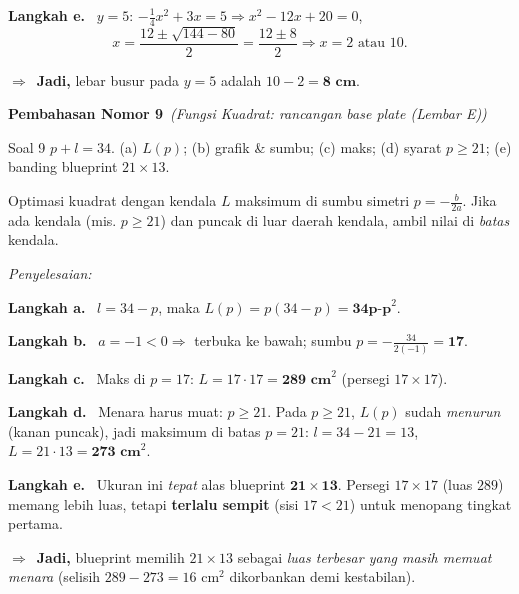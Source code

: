 \documentclass[11pt,a4paper]{article}
\newcommand{\jawab}{\par\smallskip\noindent\textit{\textcolor{oranye}{Penyelesaian:}}\par\smallskip}
\newcommand{\langkah}[1]{\par\smallskip\noindent\textbf{\textcolor{biru}{Langkah #1.}}\ }
\newcommand{\jadi}{\par\smallskip\noindent$\Rightarrow$\ \textbf{Jadi, }}
\newcommand{\nomorjudul}[2]{\par\bigskip\noindent%
  {\large\bfseries\color{ungu}Pembahasan Nomor #1}\ {\normalfont\itshape\color{gray}(#2)}\par\nopagebreak\smallskip}
\begin{document}
\langkah{e} $y=5$: $-\tfrac14x^2+3x=5\Rightarrow x^2-12x+20=0$,
\[
x=\frac{12\pm\sqrt{144-80}}{2}=\frac{12\pm8}{2}\Rightarrow x=2 \text{ atau } 10.
\]
\jadi lebar busur pada $y=5$ adalah $10-2=\textbf{8 cm}$.

\begin{center}
\end{center}

\nomorjudul{9}{Fungsi Kuadrat: rancangan base plate (Lembar E)}
\begin{soalbox}{Soal 9}
$p+l=34$. (a) $L(p)$; (b) grafik \& sumbu; (c) maks; (d) syarat $p\ge21$;
(e) banding blueprint $21\times13$.
\end{soalbox}

\begin{ingat}{Optimasi kuadrat dengan kendala}
$L$ maksimum di sumbu simetri $p=-\tfrac{b}{2a}$. Jika ada kendala (mis.
$p\ge21$) dan puncak di luar daerah kendala, ambil nilai di \emph{batas} kendala.
\end{ingat}

\jawab
\langkah{a} $l=34-p$, maka $L(p)=p(34-p)=\textbf{34p-p}^2$.

\langkah{b} $a=-1<0\Rightarrow$ terbuka ke bawah; sumbu $p=-\tfrac{34}{2(-1)}=\textbf{17}$.

\langkah{c} Maks di $p=17$: $L=17\cdot17=\textbf{289 cm}^2$ (persegi $17\times17$).

\langkah{d} Menara harus muat: $p\ge21$. Pada $p\ge21$, $L(p)$ sudah
\emph{menurun} (kanan puncak), jadi maksimum di batas $p=21$:
$l=34-21=13$, $L=21\cdot13=\textbf{273 cm}^2$.

\langkah{e} Ukuran ini \emph{tepat} alas blueprint $\mathbf{21\times13}$.
Persegi $17\times17$ (luas $289$) memang lebih luas, tetapi \textbf{terlalu sempit}
(sisi $17<21$) untuk menopang tingkat pertama. \jadi blueprint memilih $21\times13$
sebagai \emph{luas terbesar yang masih memuat menara} (selisih $289-273=16$ cm$^2$
dikorbankan demi kestabilan).
\end{document}
